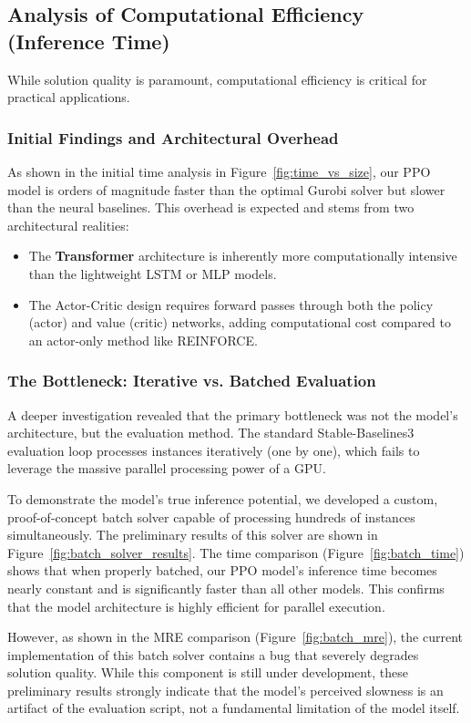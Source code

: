 \subsection{Analysis of Computational Efficiency (Inference Time)}
While solution quality is paramount, computational efficiency is critical for practical applications.

\subsubsection{Initial Findings and Architectural Overhead}
As shown in the initial time analysis in Figure~\ref{fig:time_vs_size}, our PPO model is orders of magnitude faster than the optimal Gurobi solver but slower than the neural baselines. This overhead is expected and stems from two architectural realities:
\begin{itemize}
    \item The \textbf{Transformer} architecture is inherently more computationally intensive than the lightweight LSTM or MLP models.
    \item The Actor-Critic design requires forward passes through both the policy (actor) and value (critic) networks, adding computational cost compared to an actor-only method like REINFORCE.
\end{itemize}

\subsubsection{The Bottleneck: Iterative vs. Batched Evaluation}
A deeper investigation revealed that the primary bottleneck was not the model's architecture, but the evaluation method. The standard Stable-Baselines3 evaluation loop processes instances iteratively (one by one), which fails to leverage the massive parallel processing power of a GPU.

To demonstrate the model's true inference potential, we developed a custom, proof-of-concept batch solver capable of processing hundreds of instances simultaneously. The preliminary results of this solver are shown in Figure~\ref{fig:batch_solver_results}. The time comparison (Figure~\ref{fig:batch_time}) shows that when properly batched, our PPO model's inference time becomes nearly constant and is significantly faster than all other models. This confirms that the model architecture is highly efficient for parallel execution.

However, as shown in the MRE comparison (Figure~\ref{fig:batch_mre}), the current implementation of this batch solver contains a bug that severely degrades solution quality. While this component is still under development, these preliminary results strongly indicate that the model's perceived slowness is an artifact of the evaluation script, not a fundamental limitation of the model itself.

